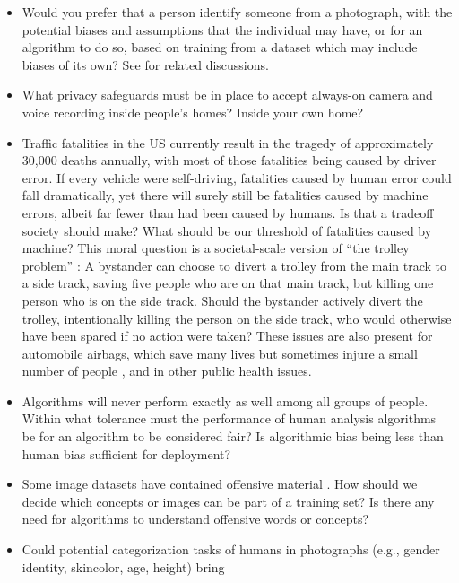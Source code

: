 \begin{itemize}
  \item Would you prefer that a person identify someone from a
        photograph, with the potential biases and assumptions that the
        individual may have, or for an algorithm to do so, based on training
        from a dataset which may include biases of its own? See \cite{Kearns2020,Mullainathan2019} for related discussions.
  \item What privacy safeguards must be in place to accept always-on
        camera and voice recording inside people's homes?  Inside your own home?
  \item Traffic fatalities in the US currently result in the tragedy
        of approximately
        30,000 deaths annually, with most of those fatalities being caused by
        driver error. If every vehicle were self-driving, fatalities caused by human error could fall dramatically, yet there will surely still be fatalities caused by machine errors, albeit far fewer than had been caused by humans.  Is that a tradeoff society should make? What should be our threshold of fatalities caused by machine?
        This moral question is a societal-scale
        version of ``the trolley problem'' \cite{Thomson1985}:  A bystander can choose to divert a trolley from the main track to a side track, saving five people who are on that main track, but killing one person who is on the side track.  Should the bystander actively divert the trolley, intentionally killing the person on the side track, who would otherwise have been spared if no action were taken?  These issues are also present for automobile airbags, which save many lives but sometimes injure a small number of  people \cite{Dalmotas1995}, and in other public health issues.
  \item
        Algorithms will never perform exactly as well among all groups of
        people. Within what tolerance must the performance of human analysis
        algorithms be for an algorithm to be considered fair?  Is algorithmic bias being less than human bias sufficient for deployment?
  \item  Some image datasets have contained offensive material \cite{Birhand2021,Barber2019}. How should we decide which concepts or images can be part of a training set?  Is there any need for algorithms to understand offensive words or concepts?
  \item Could potential categorization tasks of humans in photographs  (e.g., gender identity, skincolor,
        age, height) bring

\end{itemize}
